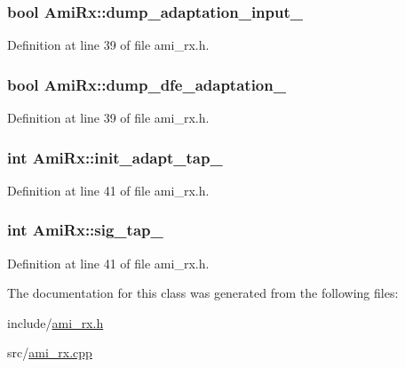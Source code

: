 \subsubsection[{dump\+\_\+adaptation\+\_\+input\+\_\+}]{\setlength{\rightskip}{0pt plus 5cm}bool Ami\+Rx\+::dump\+\_\+adaptation\+\_\+input\+\_\+\hspace{0.3cm}{\ttfamily [protected]}}\label{class_ami_rx_a2bda560b4aa1312dcd9654294b1d7e76}


Definition at line 39 of file ami\+\_\+rx.\+h.

\hypertarget{class_ami_rx_a985a6dc41e2c65429ad773a6c04a356b}{}
\subsubsection[{dump\+\_\+dfe\+\_\+adaptation\+\_\+}]{\setlength{\rightskip}{0pt plus 5cm}bool Ami\+Rx\+::dump\+\_\+dfe\+\_\+adaptation\+\_\+\hspace{0.3cm}{\ttfamily [protected]}}\label{class_ami_rx_a985a6dc41e2c65429ad773a6c04a356b}


Definition at line 39 of file ami\+\_\+rx.\+h.

\hypertarget{class_ami_rx_a20d036e33d3690b8274fb5e338ce4d53}{}
\subsubsection[{init\+\_\+adapt\+\_\+tap\+\_\+}]{\setlength{\rightskip}{0pt plus 5cm}int Ami\+Rx\+::init\+\_\+adapt\+\_\+tap\+\_\+\hspace{0.3cm}{\ttfamily [protected]}}\label{class_ami_rx_a20d036e33d3690b8274fb5e338ce4d53}


Definition at line 41 of file ami\+\_\+rx.\+h.

\hypertarget{class_ami_rx_a93343b91ac17149bce7ef0a971512507}{}
\subsubsection[{sig\+\_\+tap\+\_\+}]{\setlength{\rightskip}{0pt plus 5cm}int Ami\+Rx\+::sig\+\_\+tap\+\_\+\hspace{0.3cm}{\ttfamily [protected]}}\label{class_ami_rx_a93343b91ac17149bce7ef0a971512507}


Definition at line 41 of file ami\+\_\+rx.\+h.



The documentation for this class was generated from the following files\+:\begin{DoxyCompactItemize}
\item 
include/\hyperlink{ami__rx_8h}{ami\+\_\+rx.\+h}\item 
src/\hyperlink{ami__rx_8cpp}{ami\+\_\+rx.\+cpp}\end{DoxyCompactItemize}
